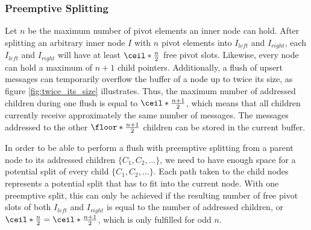 \subsubsection{Preemptive Splitting}
Let $n$ be the maximum number of pivot elements an inner node can hold. After splitting an arbitrary inner node $I$ with $n$ pivot elements into $I_{left}$ and $I_{right}$, each $I_{left}$ and $I_{right}$ will have at least $\ceil*{\frac{n}{2}}$ free pivot slots.\newline
Likewise, every node can hold a maximum of $n + 1$ child pointers. Additionally, a flush of upsert messages can temporarily overflow the buffer of a node up to twice its size, as figure \ref{fig:twice_its_size} illustrates. Thus, the maximum number of addressed children during one flush is equal to $\ceil*{\frac{n + 1}{2}}$, which means that all children currently receive approximately the same number of messages. The messages addressed to the other $\floor*{\frac{n + 1}{2}}$ children can be stored in the current buffer.

In order to be able to perform a flush with preemptive splitting from a parent node to its addressed children $\{C_1, C_2, ...\}$, we need to have enough space for a potential split of every child $\{C_1, C_2, ...\}$. Each path taken to the child nodes represents a potential split that has to fit into the current node. With one preemptive split, this can only be achieved if the resulting number of free pivot slots of both $I_{left}$ and $I_{right}$ is equal to the number of addressed children, or $\ceil*{\frac{n}{2}} = \ceil*{\frac{n + 1}{2}}$, which is only fulfilled for odd $n$.


